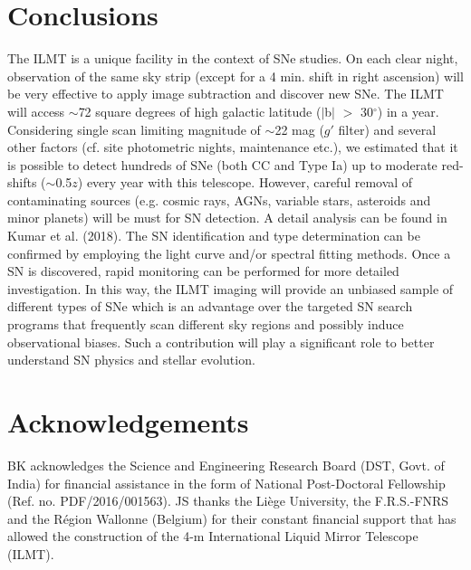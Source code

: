 \documentclass[12pt,a4paper]{article}
\begin{document}
\section{Conclusions}

The ILMT is a unique facility in the context of SNe studies. On each clear night, observation of the same 
sky strip (except for a 4 min. shift in right ascension) will be very effective to apply image subtraction 
and discover new SNe. 
The ILMT will access $\sim$72 square degrees of high galactic latitude ($\mid$b$\mid$ $>$ 30$^\circ$)
in a year. Considering single scan limiting magnitude of $\sim$22 mag ($g'$ filter) and several
other factors (cf. site photometric nights, maintenance etc.), we estimated that it is possible to detect 
hundreds of SNe (both CC and Type Ia) up to moderate red-shifts ($\sim$0.5$z$) every year with this 
telescope. 
However, careful removal of contaminating sources (e.g. cosmic rays, AGNs, variable stars, 
asteroids and minor planets) will be must for SN detection. A detail analysis can be found in Kumar et al. 
(2018).
%
The SN identification and type determination can be confirmed by employing the light curve and/or 
spectral fitting methods. Once a SN is discovered, rapid monitoring can be performed for more detailed 
investigation. 
In this way, the ILMT imaging will provide an unbiased sample of different types of SNe
which is an advantage over the targeted SN search programs that frequently scan different 
sky regions and possibly induce observational biases. Such a contribution will play a significant 
role to better understand SN physics and stellar evolution. 

%
%
\section*{Acknowledgements}
BK acknowledges the Science and Engineering Research Board (DST, Govt. of India) for financial assistance
in the form of National Post-Doctoral Fellowship (Ref. no. PDF/2016/001563).
JS thanks the Li\`{e}ge University, the F.R.S.-FNRS and the R\'{e}gion Wallonne (Belgium) for their 
constant financial support that has allowed the construction of the 4-m International Liquid Mirror 
Telescope (ILMT). 

%
%
\end{document}
